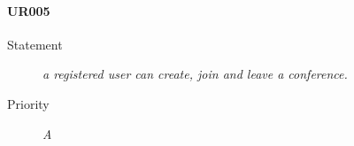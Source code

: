 \paragraph{UR005}
\begin{description}
  \item [Statement] 
    \textit{ a registered user can create, join and leave a conference.}
  \item [Priority] \textit{A}
\end{description}


